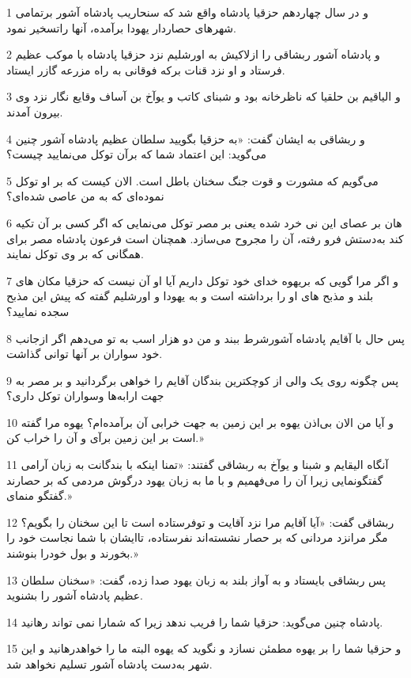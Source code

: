 \par 1 و در سال چهاردهم حزقیا پادشاه واقع شد که سنحاریب پادشاه آشور برتمامی شهرهای حصاردار یهودا برآمده، آنها راتسخیر نمود.
\par 2 و پادشاه آشور ربشاقی را ازلاکیش به اورشلیم نزد حزقیا پادشاه با موکب عظیم فرستاد و او نزد قنات برکه فوقانی به راه مزرعه گازر ایستاد.
\par 3 و الیاقیم بن حلقیا که ناظرخانه بود و شبنای کاتب و یوآخ بن آساف وقایع نگار نزد وی بیرون آمدند.
\par 4 و ربشاقی به ایشان گفت: «به حزقیا بگویید سلطان عظیم پادشاه آشور چنین می‌گوید: این اعتماد شما که برآن توکل می‌نمایید چیست؟
\par 5 می‌گویم که مشورت و قوت جنگ سخنان باطل است. الان کیست که بر او توکل نموده‌ای که به من عاصی شده‌ای؟
\par 6 هان بر عصای این نی خرد شده یعنی بر مصر توکل می‌نمایی که اگر کسی بر آن تکیه کند به‌دستش فرو رفته، آن را مجروح می‌سازد. همچنان است فرعون پادشاه مصر برای همگانی که بر وی توکل نمایند.
\par 7 و اگر مرا گویی که بریهوه خدای خود توکل داریم آیا او آن نیست که حزقیا مکان های بلند و مذبح های او را برداشته است و به یهودا و اورشلیم گفته که پیش این مذبح سجده نمایید؟
\par 8 پس حال با آقایم پادشاه آشورشرط ببند و من دو هزار اسب به تو می‌دهم اگر ازجانب خود سواران بر آنها توانی گذاشت.
\par 9 پس چگونه روی یک والی از کوچکترین بندگان آقایم را خواهی برگردانید و بر مصر به جهت ارابه‌ها وسواران توکل داری؟
\par 10 و آیا من الان بی‌اذن یهوه بر این زمین به جهت خرابی آن برآمده‌ام؟ یهوه مرا گفته است بر این زمین برآی و آن را خراب کن.»
\par 11 آنگاه الیقایم و شبنا و یوآخ به ربشاقی گفتند: «تمنا اینکه با بندگانت به زبان آرامی گفتگونمایی زیرا آن را می‌فهمیم و با ما به زبان یهود درگوش مردمی که بر حصارند گفتگو منمای.»
\par 12 ربشاقی گفت: «آیا آقایم مرا نزد آقایت و توفرستاده است تا این سخنان را بگویم؟ مگر مرانزد مردانی که بر حصار نشسته‌اند نفرستاده، تاایشان با شما نجاست خود را بخورند و بول خودرا بنوشند.»
\par 13 پس ربشاقی بایستاد و به آواز بلند به زبان یهود صدا زده، گفت: «سخنان سلطان عظیم پادشاه آشور را بشنوید.
\par 14 پادشاه چنین می‌گوید: حزقیا شما را فریب ندهد زیرا که شمارا نمی تواند رهانید.
\par 15 و حزقیا شما را بر یهوه مطمئن نسازد و نگوید که یهوه البته ما را خواهدرهانید و این شهر به‌دست پادشاه آشور تسلیم نخواهد شد.
